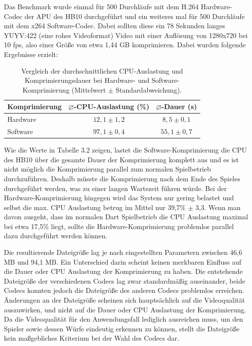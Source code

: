 Das Benchmark wurde einmal für 500 Durchläufe mit dem H.264 Hardware-Codec der APU des HB10 durchgeführt und ein weiteres mal für 500 Durchläufe mit dem x264 Software-Codec. Dabei sollten diese ein 78 Sekunden langes YUYV:422 (eine rohes Videoformat) 
Video mit einer Auflösung von 1280x720 bei 10 fps, also einer Größe von etwa 1,44 GB komprimieren. Dabei wurden folgende Ergebnisse erzielt: 

\begin{table}[H] 
    \centering 
    \begin{tabular}{|l|c|c|} 
        \hline 
        \textbf{Komprimierung} & \textbf{$\varnothing$-CPU-Auslastung (\%)} & \textbf{$\varnothing$-Dauer (s)} \\ 
        \hline 
        Hardware & $12{,}1 \pm 1{,}2$ & $8{,}5 \pm 0{,}1$ \\ 
        Software & $97{,}1 \pm 0{,}4$ & $55{,}1 \pm 0{,}7$ \\ 
        \hline 
    \end{tabular} 
    \caption{Vergleich der durchschnittlichen CPU-Auslastung und Komprimierungsdauer bei Hardware- und Software-Komprimierung (Mittelwert $\pm$ Standardabweichung).} 
    \label{tab:hardware_software_vergleich} 
\end{table}

Wie die Werte in Tabelle 3.2 zeigen, lastet die Software-Komprimierung die CPU des HB10 über die gesamte Dauer der Komprimierung komplett aus und es ist nicht möglich die Komprimierung parallel zum normalen Spielbetrieb durchzuführen. Deshalb müsste die Komprimierung nach dem Ende des Spieles durchgeführt werden, 
was zu einer langen Wartezeit führen würde. Bei der Hardware-Komprimierung hingegen wird das System nur gering belastet und selbst die max. CPU Auslastung betrug im Mittel nur 39,7\% $\pm$ 3,3. Wenn man davon ausgeht, 
dass im normalen Dart Spielbetrieb die CPU Auslastung maximal bei etwa 17,5\% liegt, sollte die Hardware-Komprimierung problemlos parallel dazu durchgeführt werden können.

Die resultierende Dateigröße lag je nach eingestellten Parametern zwischen 46,6 MB und 94,1 MB.
Ein Unterschied darin scheint keinen merkbaren Einfluss auf die Dauer oder CPU Auslastung der Komprimierung zu haben. Die entstehende Dateigröße der verschiedenen Codecs lag zwar standardmäßig auseinander, beide Codecs konnten jedoch die Dateigröße des anderen Codecs problemlos erreichen.
Änderungen an der Dateigröße scheinen sich hauptsächlich auf die Videoqualität auszuwirken, und nicht auf die Dauer oder CPU Auslastung der Komprimierung. Da die Videoqualität für den Anwendungsfall lediglich ausreichen muss, um den Spieler sowie dessen Würfe eindeutig erkennen zu können, 
stellt die Dateigröße kein maßgebliches Kriterium bei der Wahl des Codecs dar.

